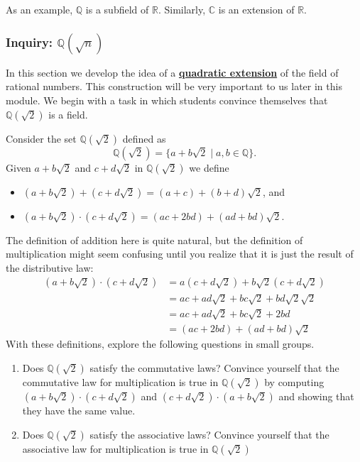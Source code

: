 \documentclass[11pt]{article}
\newenvironment{task}
	{\begin{mdframed}[linecolor=lightgray, linewidth=3pt]\raggedright}
	{\end{mdframed}}
\renewcommand\emph[1]{\underline{\bf{#1}}} %
\theoremstyle{definition}
\begin{document}
As an example, $\mathbb{Q}$ is a subfield of $\mathbb{R}$. Similarly, $\mathbb{C}$ is an extension of $\mathbb{R}$.

\subsubsection{Inquiry: $\mathbb{Q}(\sqrt{n})$}

In this section we develop the idea of a \emph{quadratic extension} of the field of rational numbers. This construction will be very important to us
later in this module. We begin with a task in which students convince themselves that $\mathbb{Q}(\sqrt{2})$ is a field.

\begin{task}

  Consider the set $\mathbb{Q}(\sqrt{2})$ defined as
  \[ \mathbb{Q}(\sqrt{2}) = \{ a + b\sqrt{2} \mid a, b\in \mathbb{Q}\}. \]
  Given $a+b\sqrt{2}$ and $c+d\sqrt{2}$ in $\mathbb{Q}(\sqrt{2})$ we define
  \begin{itemize}
    \item $(a+b\sqrt{2})+(c+d\sqrt{2}) = (a+c) + (b+d)\sqrt{2}$, and
    \item $(a+b\sqrt{2})\cdot (c+d\sqrt{2}) = (ac + 2bd) + (ad +bd)\sqrt{2}$.
  \end{itemize}
  The definition of addition here is quite natural, but the definition of multiplication might seem confusing until you realize that it is just
  the result of the distributive law:
  \begin{align*}
    (a+b\sqrt{2})\cdot (c+d\sqrt{2}) &= a(c+d\sqrt{2}) + b\sqrt{2}(c+d\sqrt{2})\\
                                     &= ac + ad\sqrt{2} + bc\sqrt{2} + bd \sqrt{2}\sqrt{2}\\
                                     &= ac + ad\sqrt{2} + bc\sqrt{2} + 2bd\\
                                     &= (ac + 2bd) + (ad +bd)\sqrt{2}
  \end{align*}
  With these definitions, explore the following questions in small groups.
  \begin{enumerate}
    \item Does $\mathbb{Q}(\sqrt{2})$ satisfy the commutative laws? Convince yourself that the commutative law for multiplication is true in $\mathbb{Q}(\sqrt{2})$
      by computing $(a+b\sqrt{2})\cdot (c+d\sqrt{2})$ and $(c+d\sqrt{2})\cdot (a+b\sqrt{2})$ and showing that they have the same value.
    \item Does $\mathbb{Q}(\sqrt{2})$ satisfy the associative laws? Convince yourself that the associative law for multiplication is true in $\mathbb{Q}(\sqrt{2})$

\end{enumerate}
\end{task}
\end{document}
